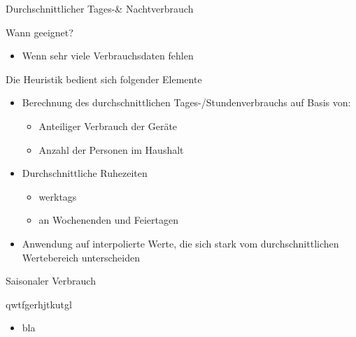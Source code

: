 \begin{frame}{Durchschnittlicher Tages-\& Nachtverbrauch}
\begin{block}{Wann geeignet?}
\begin{itemize}
\item Wenn sehr viele Verbrauchsdaten fehlen
\end{itemize}
\end{block}
\begin{block}{Die Heuristik bedient sich folgender Elemente}
\begin{itemize}
\item Berechnung des durchschnittlichen Tages-/Stundenverbrauchs auf Basis von:
\begin{itemize}
\item Anteiliger Verbrauch der Geräte
\item Anzahl der Personen im Haushalt
\end{itemize}
\item Durchschnittliche Ruhezeiten
\begin{itemize}
\item werktags
\item an Wochenenden und Feiertagen
\end{itemize}
\item Anwendung auf interpolierte Werte, die sich stark vom durchschnittlichen Wertebereich unterscheiden
\end{itemize}
\end{block}
\end{frame}

\begin{frame}{Saisonaler Verbrauch}
\begin{block}{qwtfgerhjtkutgl}
\begin{itemize}
\item bla
\end{itemize}
\end{block}
\end{frame}